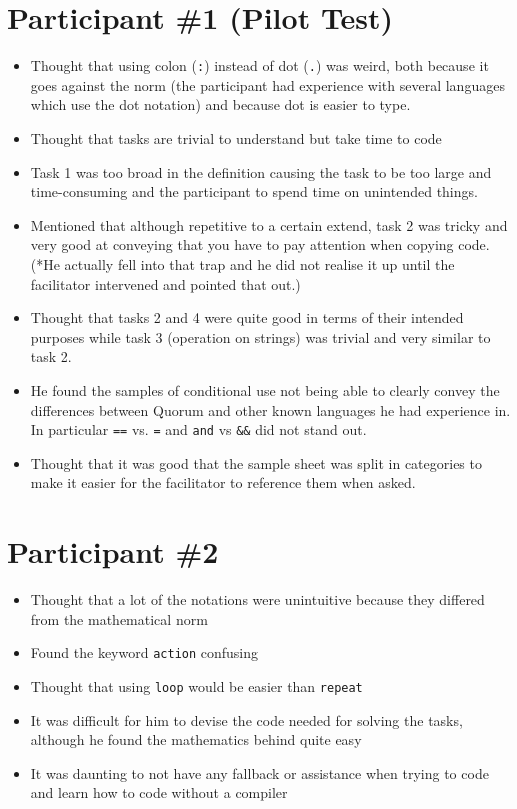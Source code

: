 \section{Participant {\#}1 (Pilot Test)}
\begin{itemize}
\item Thought that using colon (\lstinline!:!) instead of dot (\lstinline!.!) was weird, both because it goes against the norm (the participant had experience with several languages which use the dot notation) and because dot is easier to type. 
\item Thought that tasks are trivial to understand but take time to code
\item Task 1 was too broad in the definition causing the task to be too large and time-consuming and the participant to spend time on unintended things.
\item Mentioned that although repetitive to a certain extend, task 2 was tricky and very good at conveying that you have to pay attention when copying code. 
(*He actually fell into that trap and he did not realise it up until the facilitator intervened and pointed that out.) 
\item Thought that tasks 2 and 4 were quite good in terms of their intended purposes while task 3 (operation on strings) was trivial and very similar to task 2. 
\item He found the samples of conditional use not being able to clearly convey the differences between Quorum and other known languages he had experience in. In particular \lstinline!==! vs. \lstinline!=! and \lstinline!and! vs \lstinline!&&! did not stand out.
\item Thought that it was good that the sample sheet was split in categories to make it easier for the facilitator to reference them when asked.
\end{itemize}
\section{Participant {\#}2}
\begin{itemize}
\item Thought that a lot of the notations were unintuitive because they differed from the mathematical norm
\item Found the keyword \lstinline!action! confusing 
\item Thought that using \lstinline!loop! would be easier than \lstinline!repeat!
\item It was difficult for him to devise the code needed for solving the tasks, although he found the mathematics behind quite easy
\item It was daunting to not have any fallback or assistance when trying to code and learn how to code without a compiler
\end{itemize}
